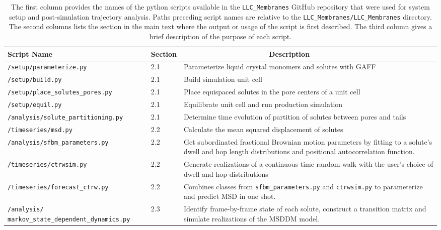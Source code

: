 \documentclass{article}
\begin{document}
  \begin{table}[htb!]
  \centering
  \begin{tabular}{|A|B|C|}
  \hline
  \textbf{Script Name} & \textbf{Section} & ~~~~~~~~~~~~~~~~~~~~~\textbf{Description} \\
  \hline

  \texttt{/setup/parameterize.py}            & 2.1 & Parameterize liquid crystal monomers and solutes with GAFF \\ \hline
  \texttt{/setup/build.py}                   & 2.1 & Build simulation unit cell \\ \hline
  \texttt{/setup/place\_solutes\_pores.py}   & 2.1 & Place equispaced solutes in the pore centers of a unit cell \\\hline
  \texttt{/setup/equil.py}                   & 2.1 & Equilibrate unit cell and run production simulation \\\hline
  \texttt{/analysis/solute\_partitioning.py} & 2.1 & Determine time evolution of partition of solutes between pores and tails \\\hline
  \texttt{/timeseries/msd.py}                & 2.2 & Calculate the mean squared displacement of solutes \\\hline
  \texttt{/analysis/sfbm\_parameters.py}     & 2.2 & Get subordinated fractional Brownian motion parameters by fitting to a solute's dwell and hop length distributions and positional autocorrelation function. \\\hline
  \texttt{/timeseries/ctrwsim.py}            & 2.2 & Generate realizations of a continuous time random walk with the user's choice of dwell and hop distributions \\\hline
  \texttt{/timeseries/forecast\_ctrw.py}     & 2.2 & Combines classes from \texttt{sfbm\_parameters.py} and \texttt{ctrwsim.py} to parameterize and predict MSD in one shot. \\\hline
  \texttt{/analysis/ markov\_state\_dependent\_dynamics.py} & 2.3 & Identify frame-by-frame state of each solute, construct a transition matrix and simulate realizations of the MSDDM model. \\\hline

  \end{tabular}

  \caption{The first column provides the names of the python scripts available in
  the \texttt{LLC\_Membranes} GitHub repository that were used for system setup and
  post-simulation trajectory analysis. Paths preceding script names are relative to the
  \texttt{LLC\_Membranes/LLC\_Membranes} directory. The second columns lists the section in the main
  text where the output or usage of the script is first described. The third column
  gives a brief description of the purpose of each script.
  }~\label{table:python_scripts}

  \end{table}
  
\end{document}
